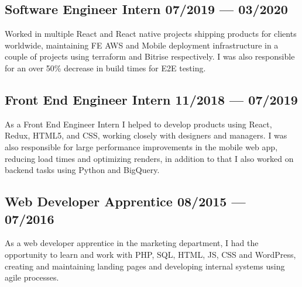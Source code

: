 \documentclass[letter,10pt]{article}
\begin{document}
\subsection{{Software Engineer Intern \hfill 07/2019 --- 03/2020}}
\vspace{3mm} 
Worked in multiple React and React native projects shipping products for clients worldwide, maintaining FE AWS and Mobile deployment infrastructure in a couple of projects using terraform and Bitrise respectively. I was also responsible for an over 50\% decrease in build times for E2E testing.
\vspace{1mm} 

\subsection{{Front End Engineer Intern \hfill 11/2018 --- 07/2019}}
\vspace{3mm} 
As a Front End Engineer Intern I helped to develop products using React, Redux, HTML5, and CSS, working closely with designers and managers. I was also responsible for large performance improvements in the mobile web app, reducing load times and optimizing renders, in addition to that I also worked on backend tasks using Python and BigQuery. 

\subsection{{Web Developer Apprentice \hfill 08/2015 --- 07/2016}}
\vspace{3mm} 
As a web developer apprentice in the marketing department, I had the opportunity to learn and work with PHP, SQL, HTML, JS, CSS and WordPress, creating and maintaining landing pages and developing internal systems using agile processes.
\end{document}
